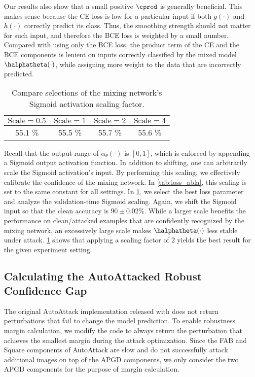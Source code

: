 \documentclass[11pt, letterpaper]{article}
\theoremstyle{plain}
\theoremstyle{definition}
\begin{document}
Our results also show that a small positive $\cprod$ is generally beneficial. This makes sense because the CE loss is low for a particular input if both $g (\cdot)$ and $h (\cdot)$ correctly predict its class. Thus, the smoothing strength should not matter for such input, and therefore the BCE loss is weighted by a small number. Compared with using only the BCE loss, the product term of the CE and the BCE components is lenient on inputs correctly classified by the mixed model $\halphatheta (\cdot)$, while assigning more weight to the data that are incorrectly predicted.

\begin{table}
\centering
\caption{Compare selections of the mixing network's Sigmoid activation scaling factor.}
\label{tab:scale_abla}
\begin{small}
\begin{tabular}{c|c|c|c}
	\toprule
	$\text{Scale}=0.5$ & $\text{Scale}=1$ & $\text{Scale}=2$ & $\text{Scale}=4$ \\
	\midrule
	55.1 \% & 55.5 \% & 55.7 \% & 55.6 \% \\
	\bottomrule
\end{tabular}
\end{small}
\end{table}

Recall that the output range of $\alpha_\theta (\cdot)$ is $[0, 1]$, which is enforced by appending a Sigmoid output activation function. In addition to shifting, one can arbitrarily scale the Sigmoid activation's input. By performing this scaling, we effectively calibrate the confidence of the mixing network. In \cref{tab:loss_abla}, this scaling is set to the same constant for all settings. In \cref{tab:scale_abla}, we select the best loss parameter and analyze the validation-time Sigmoid scaling. Again, we shift the Sigmoid input so that the clean accuracy is $90 \pm 0.02 \%$. While a larger scale benefits the performance on clean/attacked examples that are confidently recognized by the mixing network, an excessively large scale makes $\halphatheta (\cdot)$ less stable under attack. \cref{tab:scale_abla} shows that applying a scaling factor of $2$ yields the best result for the given experiment setting.


\subsection{Calculating the AutoAttacked Robust Confidence Gap} \label{sec:autoattack_margin}

The original AutoAttack implementation released with \citep{Croce20a} does not return perturbations that fail to change the model prediction. To enable robustness margin calculation, we modify the code to always return the perturbation that achieves the smallest margin during the attack optimization. Since the FAB and Square components of AutoAttack are slow and do not successfully attack additional images on top of the APGD components, we only consider the two APGD components for the purpose of margin calculation.
\end{document}
